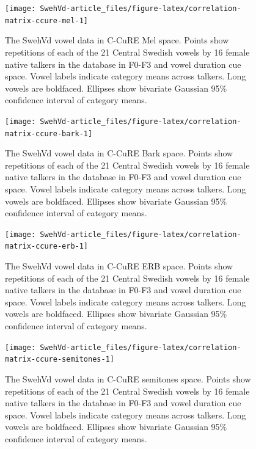 \documentclass[utf8]{frontiersSCNS}
\begin{document}
\begin{figure}
\texttt{[image: SwehVd-article\_files/figure-latex/correlation-matrix-ccure-mel-1]} \caption{The SwehVd vowel data in C-CuRE Mel space. Points show repetitions of each of the 21 Central Swedish vowels by 16 female native talkers in the database in F0-F3 and vowel duration cue space. Vowel labels indicate category means across talkers. Long vowels are boldfaced. Ellipses show bivariate Gaussian 95\% confidence interval of category means.}\label{fig:correlation-matrix-ccure-mel}
\end{figure}



\begin{figure}
\texttt{[image: SwehVd-article\_files/figure-latex/correlation-matrix-ccure-bark-1]} \caption{The SwehVd vowel data in C-CuRE Bark space. Points show repetitions of each of the 21 Central Swedish vowels by 16 female native talkers in the database in F0-F3 and vowel duration cue space. Vowel labels indicate category means across talkers. Long vowels are boldfaced. Ellipses show bivariate Gaussian 95\% confidence interval of category means.}\label{fig:correlation-matrix-ccure-bark}
\end{figure}



\begin{figure}
\texttt{[image: SwehVd-article\_files/figure-latex/correlation-matrix-ccure-erb-1]} \caption{The SwehVd vowel data in C-CuRE ERB space. Points show repetitions of each of the 21 Central Swedish vowels by 16 female native talkers in the database in F0-F3 and vowel duration cue space. Vowel labels indicate category means across talkers. Long vowels are boldfaced. Ellipses show bivariate Gaussian 95\% confidence interval of category means.}\label{fig:correlation-matrix-ccure-erb}
\end{figure}



\begin{figure}
\texttt{[image: SwehVd-article\_files/figure-latex/correlation-matrix-ccure-semitones-1]} \caption{The SwehVd vowel data in C-CuRE semitones space. Points show repetitions of each of the 21 Central Swedish vowels by 16 female native talkers in the database in F0-F3 and vowel duration cue space. Vowel labels indicate category means across talkers. Long vowels are boldfaced. Ellipses show bivariate Gaussian 95\% confidence interval of category means.}\label{fig:correlation-matrix-ccure-semitones}
\end{figure}
\end{document}
